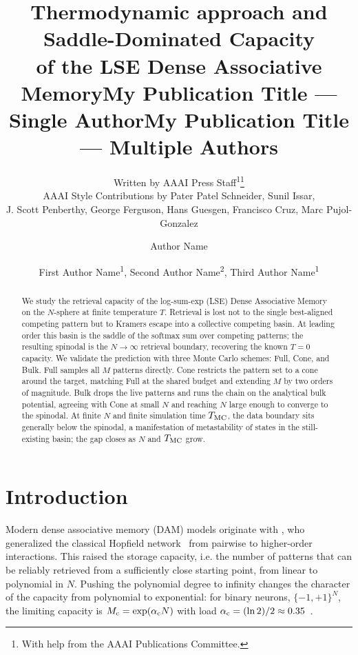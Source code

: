 \documentclass[letterpaper]{article} %
\title{\bfseries Thermodynamic approach and Saddle-Dominated Capacity
\\of the LSE Dense Associative Memory}
\author{
    Written by AAAI Press Staff\textsuperscript{\rm 1}\thanks{With help from the AAAI Publications Committee.}\\
    AAAI Style Contributions by Pater Patel Schneider,
    Sunil Issar,\\
    J. Scott Penberthy,
    George Ferguson,
    Hans Guesgen,
    Francisco Cruz\equalcontrib,
    Marc Pujol-Gonzalez\equalcontrib
}
\title{My Publication Title --- Single Author}
\author {
    Author Name
}
\title{My Publication Title --- Multiple Authors}
\author {
    First Author Name\textsuperscript{\rm 1},
    Second Author Name\textsuperscript{\rm 2},
    Third Author Name\textsuperscript{\rm 1}
}
\begin{document}
\maketitle

\begin{abstract}
We study the retrieval capacity of the log-sum-exp (LSE) Dense Associative Memory on the $N$-sphere at finite temperature $T$. Retrieval is lost not to the single best-aligned competing pattern but to Kramers escape into a collective competing basin. At leading order this basin is the saddle of the softmax sum over competing patterns; the resulting spinodal is the $N \to \infty$ retrieval boundary, recovering the known $T = 0$ capacity. We validate the prediction with three Monte Carlo schemes: Full, Cone, and Bulk. Full samples all $M$ patterns directly. Cone restricts the pattern set to a cone around the target, matching Full at the shared budget and extending $M$ by two orders of magnitude. Bulk drops the live patterns and runs the chain on the analytical bulk potential, agreeing with Cone at small $N$ and reaching $N$ large enough to converge to the spinodal. At finite $N$ and finite simulation time $T_{\rm MC}$, the data boundary sits generally below the spinodal, a manifestation of metastability of states in the still-existing basin; the gap closes as $N$ and $T_{\rm MC}$ grow.
\end{abstract}






\section{Introduction}

Modern dense associative memory (DAM) models originate with \citet{krotov2016dense}, who generalized the classical Hopfield network~\citep{Hopfield1982} from pairwise to higher-order interactions. This raised the storage capacity, i.e. the number of patterns that can be reliably retrieved from a sufficiently close starting point, from linear to polynomial in $N$. Pushing the polynomial degree to infinity changes the character of the capacity from polynomial to exponential: for binary neurons, $\{-1,+1\}^{N}$, the limiting capacity is $M_{\rm c} = \exp(\alpha_{\rm c} N)$ with load $\alpha_{\rm c} = (\ln 2)/2 \approx 0.35$~\citep{demircigil2017model}.
\end{document}
